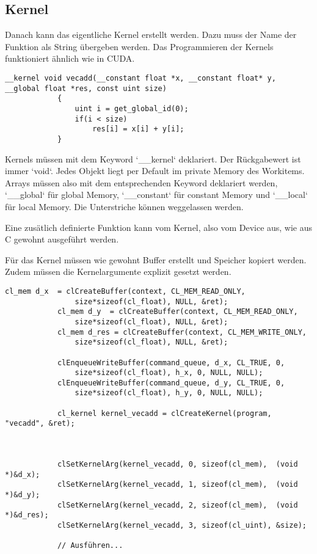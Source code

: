 			\newpage
			
			\subsection{Kernel}
			Danach kann das eigentliche \Gls{Kernel} erstellt werden. Dazu muss der Name der Funktion als String übergeben werden. Das Programmieren der Kernels funktioniert ähnlich wie in CUDA.			
			\begin{lstlisting}[caption=~Kerneldefinition]
			__kernel void vecadd(__constant float *x, __constant float* y, __global float *res, const uint size)
			{
  				uint i = get_global_id(0);
  				if(i < size)
    				res[i] = x[i] + y[i];
			}
			\end{lstlisting}
			
			\Glspl{Kernel} müssen mit dem Keyword \li`__kernel` deklariert. Der Rückgabewert ist immer \li`void`. Jedes Objekt liegt per Default im \gls{private Memory} des \Glspl{Workitem}. Arrays müssen also mit dem entsprechenden Keyword deklariert werden, \li`__global` für \gls{global Memory}, \li`__constant` für \gls{constant Memory} und \li`__local` für \gls{local Memory}. Die Unterstriche können weggelassen werden. 
			
			Eine zusätlich definierte Funktion kann vom \Gls{Kernel}, also vom Device aus, wie aus C gewohnt ausgeführt werden. 
			
			Für das \Gls{Kernel} müssen wie gewohnt Buffer erstellt und Speicher kopiert werden. Zudem müssen die Kernelargumente explizit gesetzt werden.
			\begin{lstlisting}[caption=~Kernelaufruf]
			cl_mem d_x  = clCreateBuffer(context, CL_MEM_READ_ONLY, 
				size*sizeof(cl_float), NULL, &ret);
			cl_mem d_y  = clCreateBuffer(context, CL_MEM_READ_ONLY, 
				size*sizeof(cl_float), NULL, &ret);
			cl_mem d_res = clCreateBuffer(context, CL_MEM_WRITE_ONLY, 
				size*sizeof(cl_float), NULL, &ret);
			
			clEnqueueWriteBuffer(command_queue, d_x, CL_TRUE, 0, 
				size*sizeof(cl_float), h_x, 0, NULL, NULL);
			clEnqueueWriteBuffer(command_queue, d_y, CL_TRUE, 0, 
				size*sizeof(cl_float), h_y, 0, NULL, NULL);
			
			cl_kernel kernel_vecadd = clCreateKernel(program, "vecadd", &ret);
			
			
			
			clSetKernelArg(kernel_vecadd, 0, sizeof(cl_mem),  (void *)&d_x);
			clSetKernelArg(kernel_vecadd, 1, sizeof(cl_mem),  (void *)&d_y);
			clSetKernelArg(kernel_vecadd, 2, sizeof(cl_mem),  (void *)&d_res);
			clSetKernelArg(kernel_vecadd, 3, sizeof(cl_uint), &size);
			
			// Ausführen...
			\end{lstlisting}
			

